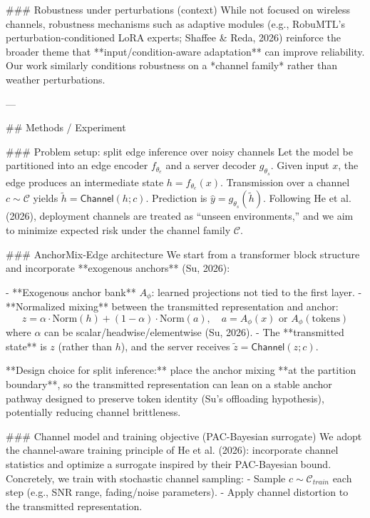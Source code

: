 ### Robustness under perturbations (context)  
While not focused on wireless channels, robustness mechanisms such as adaptive modules (e.g., RobuMTL’s perturbation-conditioned LoRA experts; Shaffee & Reda, 2026) reinforce the broader theme that **input/condition-aware adaptation** can improve reliability. Our work similarly conditions robustness on a *channel family* rather than weather perturbations.

---

## Methods / Experiment  

### Problem setup: split edge inference over noisy channels  
Let the model be partitioned into an edge encoder \(f_{\theta_e}\) and a server decoder \(g_{\theta_s}\). Given input \(x\), the edge produces an intermediate state \(h=f_{\theta_e}(x)\). Transmission over a channel \(c\sim \mathcal{C}\) yields \(\tilde{h} = \mathsf{Channel}(h; c)\). Prediction is \(\hat{y}=g_{\theta_s}(\tilde{h})\).  
Following He et al. (2026), deployment channels are treated as “unseen environments,” and we aim to minimize expected risk under the channel family \(\mathcal{C}\).

### AnchorMix-Edge architecture  
We start from a transformer block structure and incorporate **exogenous anchors** (Su, 2026):

- **Exogenous anchor bank** \(A_{\phi}\): learned projections not tied to the first layer.
- **Normalized mixing** between the transmitted representation and anchor:
  \[
  z = \alpha \cdot \mathrm{Norm}(h) + (1-\alpha)\cdot \mathrm{Norm}(a), \quad a=A_{\phi}(x) \text{ or } A_{\phi}(\text{tokens})
  \]
  where \(\alpha\) can be scalar/headwise/elementwise (Su, 2026).  
- The **transmitted state** is \(z\) (rather than \(h\)), and the server receives \(\tilde{z}=\mathsf{Channel}(z;c)\).

**Design choice for split inference:** place the anchor mixing **at the partition boundary**, so the transmitted representation can lean on a stable anchor pathway designed to preserve token identity (Su’s offloading hypothesis), potentially reducing channel brittleness.

### Channel model and training objective (PAC-Bayesian surrogate)  
We adopt the channel-aware training principle of He et al. (2026): incorporate channel statistics and optimize a surrogate inspired by their PAC-Bayesian bound. Concretely, we train with stochastic channel sampling:
- Sample \(c\sim \mathcal{C}_{train}\) each step (e.g., SNR range, fading/noise parameters).
- Apply channel distortion to the transmitted representation.


